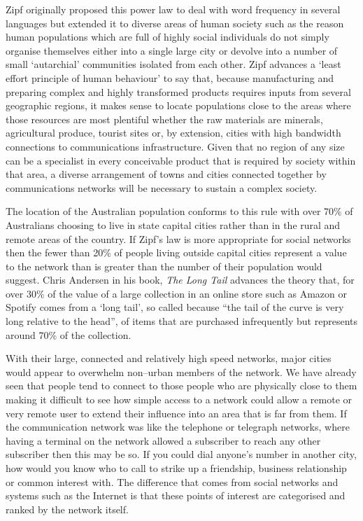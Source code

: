 Zipf originally proposed this power law to deal with word frequency in several languages but extended it to diverse areas of human society such as the reason human populations which are full of highly social individuals do not simply organise themselves either into a single large city or devolve into a number of small `autarchial' communities isolated from each other.\cite{RefWorks:299} Zipf advances a `least effort principle of human behaviour' to say that, because manufacturing and preparing complex and highly transformed products requires inputs from several geographic regions, it makes sense to locate populations close to the areas where those resources are most plentiful whether the raw materials are minerals, agricultural produce, tourist sites or, by extension, cities with high bandwidth connections to communications infrastructure. Given that no region of any size can be a specialist in every conceivable product that is required by society within that area, a diverse arrangement of towns and cities connected together by communications networks will be necessary to sustain a complex society.


The location of the Australian population conforms to this rule with over 70\% of Australians choosing to live in state capital cities rather than in the rural and remote areas of the country. If Zipf's law is more appropriate for social networks then the fewer than 20\% of people living outside capital cities represent a value to the network than is greater than the number of their population would suggest.  Chris Andersen in his book, \emph{The Long Tail} advances the theory that, for over 30\% of the value of a large collection in an online store such as Amazon or Spotify comes from a `long tail', so called because ``the tail of the curve is very long relative to the head''\cite[p10]{RefWorks:298}, of items that are purchased infrequently but represents around 70\% of the collection.

With their large, connected and relatively high speed networks, major cities would appear to overwhelm non--urban members of the network. We have already seen that people tend to connect to those people who are physically close to them making it difficult to see how simple access to a network could allow a remote or very remote user to extend their influence into an area that is far from them. If the communication network was like the telephone or telegraph networks, where having a terminal on the network allowed a subscriber to reach any other subscriber then this may be so. If you could dial anyone's number in another city, how would you know who to call to strike up a friendship, business relationship or common interest with. The difference that comes from social networks and systems such as the Internet is that these points of interest are categorised and ranked by the network itself.

